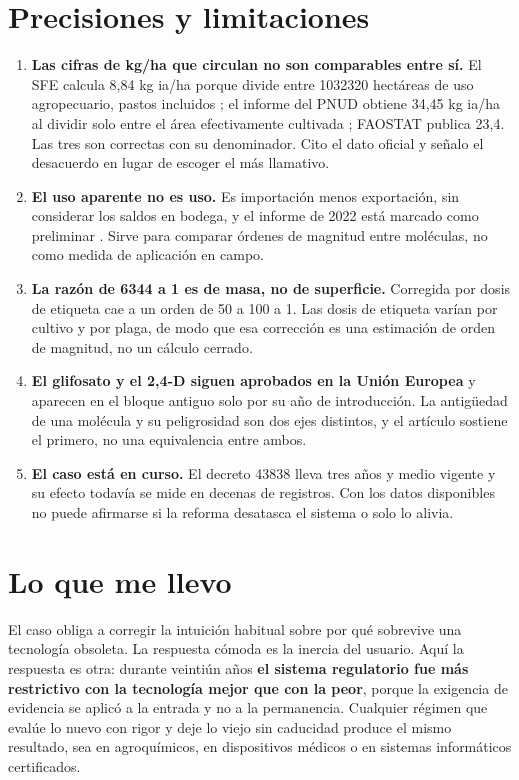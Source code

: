 \documentclass[11pt,letterpaper]{article}
\begin{document}
\section{Precisiones y limitaciones}

\begin{enumerate}
  \item \textbf{Las cifras de kg/ha que circulan no son comparables entre sí.}
    El SFE calcula 8,84 kg ia/ha porque divide entre \num{1032320} hectáreas de
    uso agropecuario, pastos incluidos \parencite{sfe2022}; el informe del PNUD
    obtiene 34,45 kg ia/ha al dividir solo entre el área efectivamente cultivada
    \parencite{vargas2021}; FAOSTAT publica 23,4. Las tres son correctas con su
    denominador. Cito el dato oficial y señalo el desacuerdo en lugar de escoger
    el más llamativo.
  \item \textbf{El uso aparente no es uso.} Es importación menos exportación, sin
    considerar los saldos en bodega, y el informe de 2022 está marcado como
    preliminar \parencite{sfe2022}. Sirve para comparar órdenes de magnitud entre
    moléculas, no como medida de aplicación en campo.
  \item \textbf{La razón de \num{6344} a 1 es de masa, no de superficie.}
    Corregida por dosis de etiqueta cae a un orden de 50 a 100 a 1. Las dosis de
    etiqueta varían por cultivo y por plaga, de modo que esa corrección es una
    estimación de orden de magnitud, no un cálculo cerrado.
  \item \textbf{El glifosato y el 2,4-D siguen aprobados en la Unión Europea} y
    aparecen en el bloque antiguo solo por su año de introducción. La antigüedad
    de una molécula y su peligrosidad son dos ejes distintos, y el artículo
    sostiene el primero, no una equivalencia entre ambos.
  \item \textbf{El caso está en curso.} El decreto 43838 lleva tres años y medio
    vigente y su efecto todavía se mide en decenas de registros. Con los datos
    disponibles no puede afirmarse si la reforma desatasca el sistema o solo lo
    alivia.
\end{enumerate}

\section*{Lo que me llevo}

El caso obliga a corregir la intuición habitual sobre por qué sobrevive una
tecnología obsoleta. La respuesta cómoda es la inercia del usuario. Aquí la
respuesta es otra: durante veintiún años \textbf{el sistema regulatorio fue más
restrictivo con la tecnología mejor que con la peor}, porque la exigencia de
evidencia se aplicó a la entrada y no a la permanencia. Cualquier régimen que
evalúe lo nuevo con rigor y deje lo viejo sin caducidad produce el mismo
resultado, sea en agroquímicos, en dispositivos médicos o en sistemas
informáticos certificados.
\end{document}
